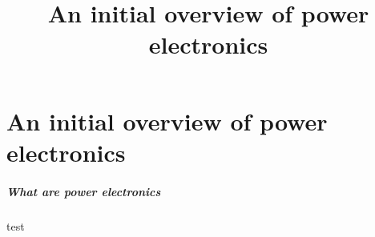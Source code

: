 \part{An initial overview of power electronics}
\title[Initial overview]{An initial overview of power electronics}  
\date{}  
\frame{\titlepage} 

\begin{frame}
	\frametitle{What are power electronics}
	test
\end{frame}